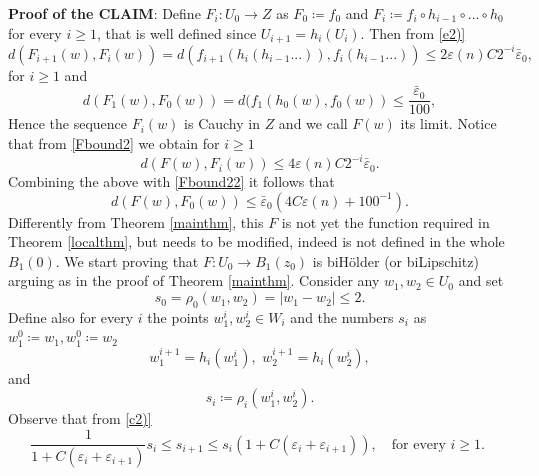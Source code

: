 \documentclass[11pt]{article}
\newcommand{\eps}{\varepsilon}
\theoremstyle{plain}
\theoremstyle{definition}
\numberwithin{equation}{section}
\begin{document}
		{\textbf {Proof of the \textbf{CLAIM}}}:
Define $F_i : U_0 \to Z$ as $F_0\coloneqq f_0$ and $F_i\coloneqq f_i \circ h_{i-1}\circ...\circ h_0$ for every $i \ge 1$,  that is  well defined since $U_{i+1}=h_i(U_i).$  Then from \ref{e2)}
\begin{equation}\label{Fbound2}
d(F_{i+1}(w),F_i(w))=d(f_{i+1}(h_i(h_{i-1}...)),f_i(h_{i-1}...))\le 2\eps(n)C2^{-i}\bar \eps_0,
\end{equation}
for $i \ge 1$ and
\begin{equation}\label{Fbound22}
d(F_{1}(w),F_0(w))=d(f_{1}(h_0(w),f_0(w))\le \frac{\bar \eps_0}{100},
\end{equation}
Hence the sequence $F_i(w)$ is Cauchy in $Z$ and we call $F(w)$ its limit. Notice that from \eqref{Fbound2} we obtain for $i \ge 1$
\begin{equation}\label{fif2}
d(F(w),F_i(w))\le  4\eps(n)C2^{-i}\bar \eps_0.
\end{equation} 
Combining the above with \eqref{Fbound22} it follows that
\begin{equation}\label{fif3}
d(F(w),F_0(w))\le  \bar \eps_0 (4C\eps(n)+100^{-1}).
\end{equation} 
Differently from Theorem \ref{mainthm}, this $F$ is not yet the function required in Theorem \ref{localthm}, but needs to be modified, indeed is not defined in the whole $B_1(0)$. We start proving that $F: U_0 \to B_1(z_0)$ is biH\"older (or biLipschitz) arguing as in the proof of Theorem \ref{mainthm}.  Consider any $w_1,w_2 \in U_0$  and set
\[s_0=\rho_0(w_1,w_2)=|w_1-w_2|\le 2.\]
Define also for every $i$ the points $w_1^i,w_2^i \in W_i$ and the numbers $s_i$ as  $w_1^0\coloneqq w_1, w_1^0\coloneqq w_2$
\[w_1^{i+1}=h_{i}(w_1^i),\,\, w_2^{i+1}=h_{i}(w_2^i),\]
and
\[ s_i\coloneqq \rho_i(w_1^i,w_2^i).\]
Observe that from \ref{c2)} 
\begin{equation}
\frac{1}{1+C(\eps_i+\eps_{i+1})}s_i\le s_{i+1}\le s_{i}(1+C(\eps_i+\eps_{i+1})), \quad \text{for every $i \ge 1$.  }
\end{equation}
\end{document}
